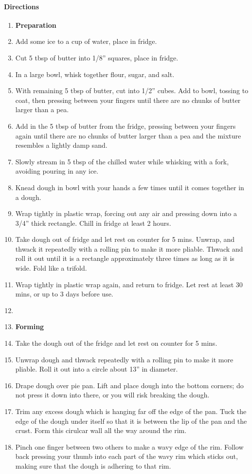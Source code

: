 \documentclass[12pt]{article}
\newenvironment*{directions}
	{
		\paragraph*{Directions}
		\begin{enumerate}
	}
	{
		\end{enumerate}
	}
\begin{document}
	\begin{directions}
		\item[] \textbf{Preparation}
		\item Add some ice to a cup of water, place in fridge.
		\item Cut 5 tbsp of butter into 1/8” squares, place in fridge.
		\item In a large bowl, whisk together flour, sugar, and salt.
		\item With remaining 5 tbsp of butter, cut into 1/2” cubes. Add to bowl, tossing to coat, then pressing between your fingers until there are no chunks of butter larger than a pea.
		\item Add in the 5 tbsp of butter from the fridge, pressing between your fingers again until there are no chunks of butter larger than a pea and the mixture resembles a lightly damp sand.
		\item Slowly stream in 5 tbsp of the chilled water while whisking with a fork, avoiding pouring in any ice.
		\item Knead dough in bowl with your hands a few times until it comes together in a dough.
		\item Wrap tightly in plastic wrap, forcing out any air and pressing down into a 3/4” thick rectangle. Chill in fridge at least 2 hours.
		\item Take dough out of fridge and let rest on counter for 5 mins. Unwrap, and thwack it repeatedly with a rolling pin to make it more pliable. Thwack and roll it out until it is a rectangle approximately three times as long as it is wide. Fold like a trifold.
		\item Wrap tightly in plastic wrap again, and return to fridge. Let rest at least 30 mins, or up to 3 days before use.
		\item[] \hfill
		\item[] \textbf{Forming}
		\item Take the dough out of the fridge and let rest on counter for 5 mins.
		\item Unwrap dough and thwack repeatedly with a rolling pin to make it more pliable. Roll it out into a circle about 13” in diameter.
		\item Drape dough over pie pan. Lift and place dough into the bottom corners; do not press it down into there, or you will risk breaking the dough.
		\item Trim any excess dough which is hanging far off the edge of the pan. Tuck the edge of the dough under itself so that it is between the lip of the pan and the crust. Form this cirulcar wall all the way around the rim.
		\item Pinch one finger between two others to make a wavy edge of the rim. Follow back pressing your thumb into each part of the wavy rim which sticks out, making sure that the dough is adhering to that rim.
	\end{directions}
	
\end{document}

